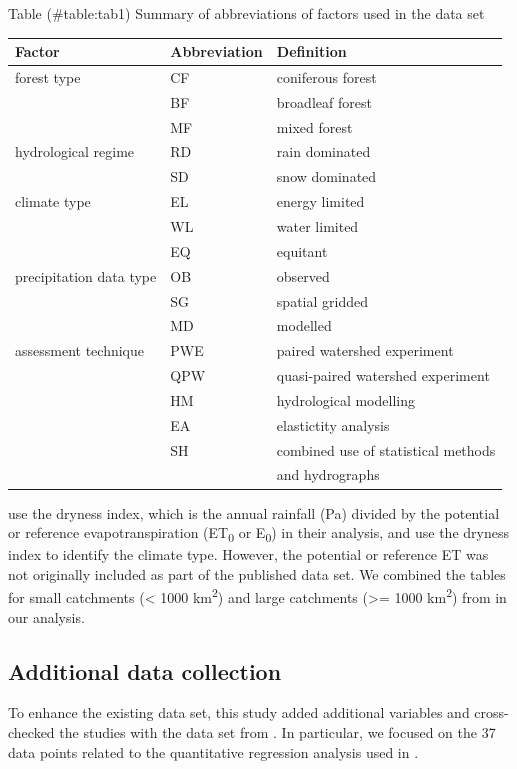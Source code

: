 \documentclass[]{elsarticle} %
\begin{document}
Table (\#table:tab1) Summary of abbreviations of factors used in the \citet{zhang2017} data set

\begin{longtable}[]{@{}lll@{}}
\toprule()
Factor & Abbreviation & Definition \\
\midrule()
\endhead
forest type & CF & coniferous forest \\
& BF & broadleaf forest \\
& MF & mixed forest \\
hydrological regime & RD & rain dominated \\
& SD & snow dominated \\
climate type & EL & energy limited \\
& WL & water limited \\
& EQ & equitant \\
precipitation data type & OB & observed \\
& SG & spatial gridded \\
& MD & modelled \\
assessment technique & PWE & paired watershed experiment \\
& QPW & quasi-paired watershed experiment \\
& HM & hydrological modelling \\
& EA & elastictity analysis \\
& SH & combined use of statistical methods \\
& & and hydrographs \\
\bottomrule()
\end{longtable}

\citet{zhang2017} use the dryness index, which is the annual rainfall (Pa) divided by the potential or reference evapotranspiration (ET\textsubscript{0} or E\textsubscript{0}) in their analysis, and use the dryness index to identify the climate type. However, the potential or reference ET was not originally included as part of the published data set. We combined the tables for small catchments (\textless{} 1000 km\textsuperscript{2}) and large catchments (\textgreater= 1000 km\textsuperscript{2}) from \citet{zhang2017} in our analysis.

\hypertarget{additional-data-collection}{%
\subsection{Additional data collection}\label{additional-data-collection}}

To enhance the existing data set, this study added additional variables and cross-checked the studies with the data set from \citet{filoso2017}. In particular, we focused on the 37 data points related to the quantitative regression analysis used in \citet{filoso2017}.
\end{document}
